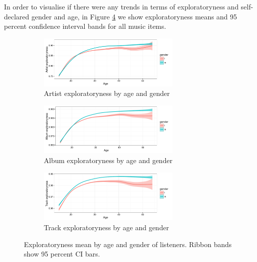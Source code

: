 In order to visualise if there were any trends in terms of exploratoryness and self-declared gender and age, in Figure \ref{fig:exploratoryness_by_gender} we show exploratoryness means and 95 percent confidence interval bands for all music items. 
\graphicspath{{./figs/ch6/}}
\begin{figure}[!h]
	\centering
	\begin{subfigure}[b]{\textwidth}
		\centering
		\includegraphics[width=0.75\textwidth]{artist_exploratoryness_by_age.pdf}
        \caption{Artist exploratoryness by age and gender}
        \label{fig:artist_exploratoryness_by_age}
	\end{subfigure}

	\begin{subfigure}[b]{\textwidth}
		\centering
		\includegraphics[width=0.75\textwidth]{album_exploratoryness_by_age.pdf}
        \caption{Album exploratoryness by age and gender}
        \label{fig:album_exploratoryness_by_age}
	\end{subfigure}

	\begin{subfigure}[b]{\textwidth}
		\centering
		\includegraphics[width=0.75\textwidth]{track_exploratoryness_by_age.pdf}
        \caption{Track exploratoryness by age and gender}
        \label{fig:track_exploratoryness_by_age}
	\end{subfigure}
\caption[Exploratoryness mean by age and gender of listeners]{Exploratoryness mean by age and gender of listeners. Ribbon bands show 95 percent CI bars.}
\label{fig:exploratoryness_by_gender}
\end{figure}

